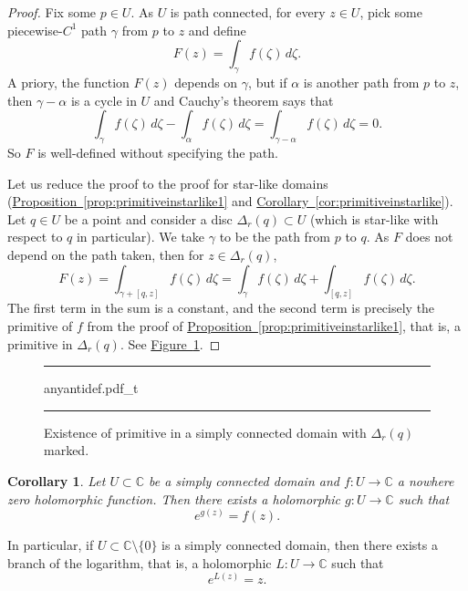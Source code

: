 \documentclass[12pt,openany]{book}
\newcommand{\C}{{\mathbb{C}}}
\theoremstyle{plain}
\newtheorem{cor}[thm]{Corollary}
\theoremstyle{remark}
\theoremstyle{definition}
\newenvironment{myfig}{%
\begin{figure}[h!t]
\noindent\rule{\textwidth}{0.5pt}\vspace{12pt}\par\centering}%
{\par\noindent\rule{\textwidth}{0.5pt}
\end{figure}}
\theoremstyle{exercise}
\theoremstyle{example}
\newcommand{\figureref}[1]{\hyperref[#1]{Figure~\ref*{#1}}}
\newcommand{\propref}[1]{\hyperref[#1]{Proposition~\ref*{#1}}}
\newcommand{\corref}[1]{\hyperref[#1]{Corollary~\ref*{#1}}}
\begin{document}
\begin{proof}
Fix some $p \in U$. As $U$ is path connected, for every $z \in U$, pick
some piecewise-$C^1$ path $\gamma$ from $p$ to $z$
and define
\begin{equation*}
F(z) = \int_\gamma f(\zeta) \, d\zeta .
\end{equation*}
A priory, the function $F(z)$ depends on $\gamma$, but
if $\alpha$ is another path from $p$ to $z$, then
$\gamma-\alpha$ is a cycle in $U$ and
Cauchy's theorem says that
\begin{equation*}
\int_\gamma f(\zeta) \, d\zeta -
\int_\alpha f(\zeta) \, d\zeta 
=
\int_{\gamma-\alpha} f(\zeta) \, d\zeta  =  0 .
\end{equation*}
So $F$ is well-defined without specifying the path.

Let us reduce the proof to the proof for 
star-like domains (\propref{prop:primitiveinstarlike1} and
\corref{cor:primitiveinstarlike}).
Let $q \in U$ be a point and consider a disc $\Delta_r(q) \subset U$
(which is star-like with respect to $q$ in particular).
We take $\gamma$ to be the path from $p$ to $q$.
As $F$ does not depend on the path taken, then for $z \in \Delta_r(q)$,
\begin{equation*}
F(z) =
\int_{\gamma+[q,z]} f(\zeta) \, d\zeta
=
\int_{\gamma} f(\zeta) \, d\zeta
+
\int_{[q,z]} f(\zeta) \, d\zeta .
\end{equation*}
The first term in the sum is a constant, and the second term is precisely
the primitive of $f$ from the proof of
\propref{prop:primitiveinstarlike1},
that is, a primitive in
$\Delta_r(q)$.
See \figureref{fig:anyantidef}.
\end{proof}

\begin{myfig}
{anyantidef.pdf_t}
\caption{Existence of primitive in a simply connected
domain with $\Delta_r(q)$ marked.\label{fig:anyantidef}}
\end{myfig}

\begin{cor} \label{cor:simplyconimpleslog}
Let $U \subset \C$ be a simply connected domain and
$f \colon U \to \C$ a nowhere zero holomorphic
function.  Then there exists a holomorphic $g \colon U \to \C$
such that
\begin{equation*}
e^{g(z)} = f(z) .
\end{equation*}
\end{cor}

In particular,
if $U \subset \C \setminus \{ 0 \}$ is a simply connected domain, then
there exists a branch of the logarithm, that is,
a holomorphic $L \colon U \to \C$ such that
\begin{equation*}
e^{L(z)} = z .
\end{equation*}
\end{document}
